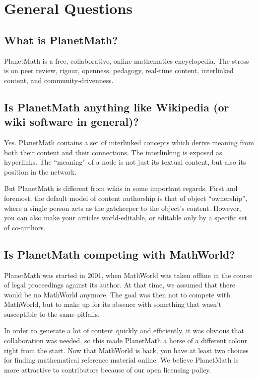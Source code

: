 
\section{General Questions}
\subsection{What is PlanetMath?}
PlanetMath is a free, collaborative, online mathematics encyclopedia. The stress is on peer review, rigour, openness, pedagogy, real-time content, interlinked content, and community-drivenness.

\subsection{Is PlanetMath anything like Wikipedia (or wiki software in general)?}
Yes. PlanetMath contains a set of interlinked concepts which derive meaning from both their content and their connections.  The interlinking is exposed as hyperlinks.  The ``meaning'' of a node is not just its textual content, but also its position in the network.  

But PlanetMath is different from wikis in some important regards.  First and foremost, the default model of content authorship is that of object ``ownership'', where a single person acts as the gatekeeper to the object's content.  However, you can also make your articles world-editable, or editable only by a specific set of co-authors.

\subsection{Is PlanetMath competing with MathWorld?}
PlanetMath was started in 2001, when MathWorld was taken offline in the course of legal proceedings against its author.   At that time, we assumed that there would be no MathWorld anymore.  The goal was then not to compete with MathWorld, but to make up for its absence with something that wasn't susceptible to the same pitfalls. 

In order to generate a lot of content quickly and efficiently, it was obvious that collaboration was needed, so this made PlanetMath a horse of a different colour right from the start.  Now that MathWorld is back, you have at least two choices for finding mathematical reference material online.   We believe PlanetMath is more attractive to contributors because of our open licensing policy.

